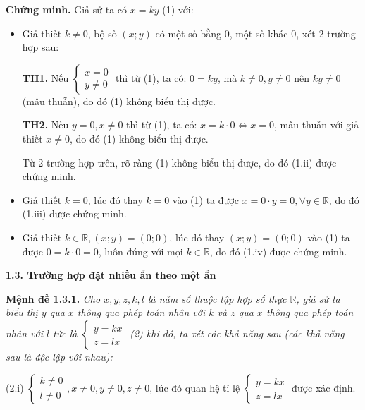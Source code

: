 \documentclass[12pt]{report}
\begin{document}
\vspace{0.3cm}
\noindent \textbf{Chứng minh.} Giả sử ta có $x = ky$ (1) với:
\begin{itemize} %
      \item Giả thiết $k \neq 0$, bộ số $(x; y)$ có một số bằng 0, một số khác 0, xét 2 trường hợp sau:
    
    \textbf{TH1.} Nếu $\begin{cases} x = 0 \\ y \neq 0 \end{cases}$ thì từ (1), ta có: $0 = ky$, mà $k \neq 0, y \neq 0$ nên $ky \neq 0$ (mâu thuẫn), do đó (1) không biểu thị được.
    
    \textbf{TH2.} Nếu $y = 0, x \neq 0$ thì từ (1), ta có: $x = k \cdot 0 \Leftrightarrow x = 0$, mâu thuẫn với giả thiết $x \neq 0$, do đó (1) không biểu thị được.
    
    Từ 2 trường hợp trên, rõ ràng (1) không biểu thị được, do đó (1.ii) được chứng minh.
    
    \item Giả thiết $k = 0$, lúc đó thay $k = 0$ vào (1) ta được $x = 0 \cdot y = 0, \forall y \in \mathbb{R}$, do đó (1.iii) được chứng minh.
    
    \item Giả thiết $k \in \mathbb{R}, (x; y) = (0; 0)$, lúc đó thay $(x; y) = (0; 0)$ vào (1) ta được $0 = k \cdot 0 = 0$, luôn đúng với mọi $k \in \mathbb{R}$, do đó (1.iv) được chứng minh.
\end{itemize}

\vspace{0.4cm}
\noindent \textbf{1.3. Trường hợp đặt nhiều ẩn theo một ẩn}

\vspace{0.2cm}
\noindent \textbf{Mệnh đề 1.3.1.} \textit{Cho $x, y, z, k, l$ là năm số thuộc tập hợp số thực $\mathbb{R}$, giả sử ta biểu thị $y$ qua $x$ thông qua phép toán nhân với $k$ và $z$ qua $x$ thông qua phép toán nhân với $l$ tức là $\begin{cases} y = kx \\ z = lx \end{cases}$ (2) khi đó, ta xét các khả năng sau (các khả năng sau là độc lập với nhau):}

\vspace{0.3cm}
\noindent (2.i) $\begin{cases} k \neq 0 \\ l \neq 0 \end{cases}, x \neq 0, y \neq 0, z \neq 0$, lúc đó quan hệ tỉ lệ $\begin{cases} y = kx \\ z = lx \end{cases}$ được xác định.
\end{document}
